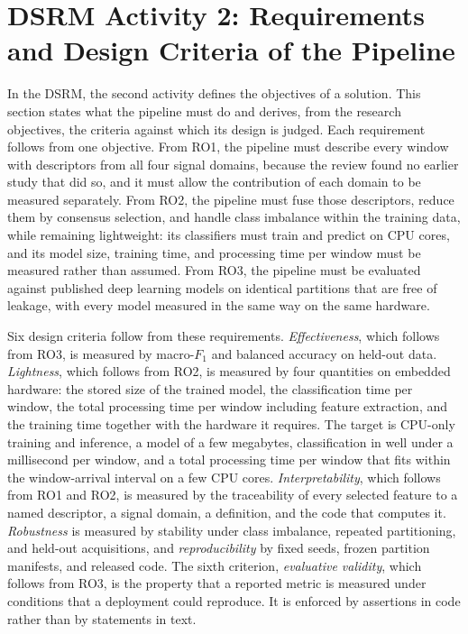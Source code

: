 \section{DSRM Activity 2: Requirements and Design Criteria of the Pipeline}
\label{sec:chap3DSRMObjectives}
In the DSRM, the second activity defines the objectives of a solution. This section states what the pipeline must do and derives, from the research objectives, the criteria against which its design is judged. Each requirement follows from one objective. From RO1, the pipeline must describe every window with descriptors from all four signal domains, because the review found no earlier study that did so, and it must allow the contribution of each domain to be measured separately. From RO2, the pipeline must fuse those descriptors, reduce them by consensus selection, and handle class imbalance within the training data, while remaining lightweight: its classifiers must train and predict on CPU cores, and its model size, training time, and processing time per window must be measured rather than assumed. From RO3, the pipeline must be evaluated against published deep learning models on identical partitions that are free of leakage, with every model measured in the same way on the same hardware.

Six design criteria follow from these requirements. \emph{Effectiveness}, which follows from RO3, is measured by macro-$F_1$ and balanced accuracy on held-out data. \emph{Lightness}, which follows from RO2, is measured by four quantities on embedded hardware: the stored size of the trained model, the classification time per window, the total processing time per window including feature extraction, and the training time together with the hardware it requires. The target is CPU-only training and inference, a model of a few megabytes, classification in well under a millisecond per window, and a total processing time per window that fits within the window-arrival interval on a few CPU cores. \emph{Interpretability}, which follows from RO1 and RO2, is measured by the traceability of every selected feature to a named descriptor, a signal domain, a definition, and the code that computes it. \emph{Robustness} is measured by stability under class imbalance, repeated partitioning, and held-out acquisitions, and \emph{reproducibility} by fixed seeds, frozen partition manifests, and released code. The sixth criterion, \emph{evaluative validity}, which follows from RO3, is the property that a reported metric is measured under conditions that a deployment could reproduce. It is enforced by assertions in code rather than by statements in text.

